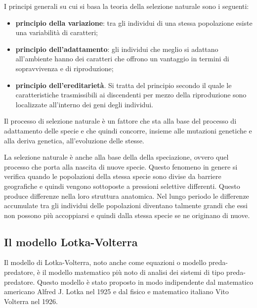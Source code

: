 \documentclass[11pt]{article}
\begin{document}
I principi generali su cui si basa la teoria della selezione naturale sono i seguenti:
\begin{itemize}
    \item \textbf{principio della variazione}: tra gli individui di una stessa popolazione esiste una variabilità di caratteri;
    \item \textbf{principio dell'adattamento}: gli individui che meglio si adattano all'ambiente hanno dei caratteri che offrono un vantaggio in termini di sopravvivenza e di riproduzione;
    \item \textbf{principio dell'ereditarietà}. Si tratta del principio secondo il quale le caratteristiche trasmissibili ai discendenti per mezzo della riproduzione sono localizzate all'interno dei geni degli individui. 
\end{itemize}

Il processo di selezione naturale è un fattore che sta alla base del processo di adattamento delle specie e che quindi concorre, insieme alle mutazioni genetiche e alla deriva genetica, all'evoluzione delle stesse.

La selezione naturale è anche alla base della della speciazione, ovvero quel processo che porta alla nascita di nuove specie. Questo fenomeno in genere si verifica quando le popolazioni della stessa specie sono divise da barriere geografiche e quindi vengono sottoposte a pressioni selettive differenti. Questo produce differenze nella loro struttura anatomica. Nel lungo periodo le differenze accumulate tra gli individui delle popolazioni diventano talmente grandi che essi non possono più accoppiarsi e quindi dalla stessa specie se ne originano di nuove. 
\subsection{Il modello Lotka-Volterra}
\label{sec:LV}
Il modello di Lotka-Volterra, noto anche come equazioni o modello preda-predatore, è il modello matematico più noto di analisi dei sistemi di tipo preda-predatore. Questo modello è stato proposto in modo indipendente dal matematico americano Alfred J. Lotka nel 1925 e dal fisico e matematico italiano Vito Volterra nel 1926. 
\end{document}
